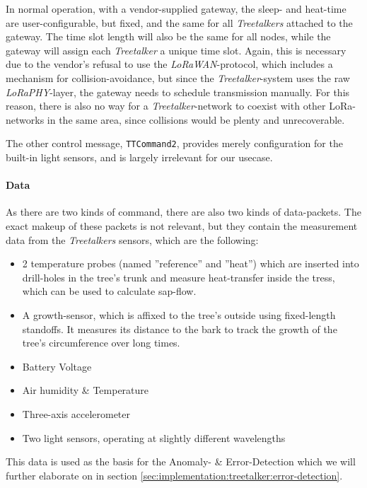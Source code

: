 In normal operation, with a vendor-supplied gateway, the sleep- and heat-time are user-configurable, but fixed, and the same for all \textit{Treetalkers} attached to the gateway.
The time slot length will also be the same for all nodes, while the gateway will assign each \textit{Treetalker} a unique time slot.
Again, this is necessary due to the vendor's refusal to use the \textit{LoRaWAN}-protocol, which includes a mechanism for collision-avoidance, but since the \textit{Treetalker}-system uses the raw \textit{LoRaPHY}-layer, the gateway needs to schedule transmission manually.
For this reason, there is also no way for a \textit{Treetalker}-network to coexist with other LoRa-networks in the same area, since collisions would be plenty and unrecoverable.

The other control message, \texttt{TTCommand2}, provides merely configuration for the built-in light sensors, and is largely irrelevant for our usecase.

\paragraph{Data}

As there are two kinds of command, there are also two kinds of data-packets.
The exact makeup of these packets is not relevant, but they contain the measurement data from the \textit{Treetalkers} sensors, which are the following:

\begin{itemize}
    \item 2 temperature probes (named ''reference'' and ''heat'') which are inserted into drill-holes in the tree's trunk and measure heat-transfer inside the tress, which can be used to calculate sap-flow.
    \item A growth-sensor, which is affixed to the tree's outside using fixed-length standoffs.
    It measures its distance to the bark to track the growth of the tree's circumference over long times.
    \item Battery Voltage
    \item Air humidity \& Temperature
    \item Three-axis accelerometer
    \item Two light sensors, operating at slightly different wavelengths
\end{itemize}

This data is used as the basis for the Anomaly- \& Error-Detection which we will further elaborate on in section \ref{sec:implementation:treetalker:error-detection}.

